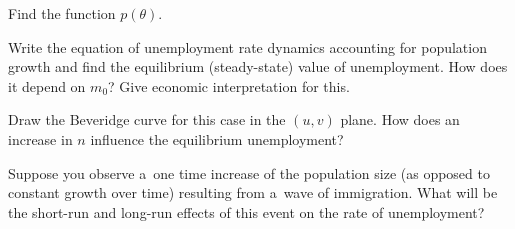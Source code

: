 \documentclass[a4paper, notitlepage, 11pt]{article}
\begin{document}
\begin{wylicz}
\item Find the function $p(\theta)$.
\item Write the equation of unemployment rate dynamics accounting for population growth and find the equilibrium (steady-state) value of unemployment. How does it depend on $m_0$? Give economic interpretation for this.
\item Draw the Beveridge curve for this case in the $(u,v)$ plane. How does an increase in $n$ influence the equilibrium unemployment?
\item Suppose you observe a~one time increase of the population size (as opposed to constant growth over time) resulting from a~wave of immigration. What will be the short-run and long-run effects of this event on the rate of unemployment?
\end{wylicz}


\end{document}
